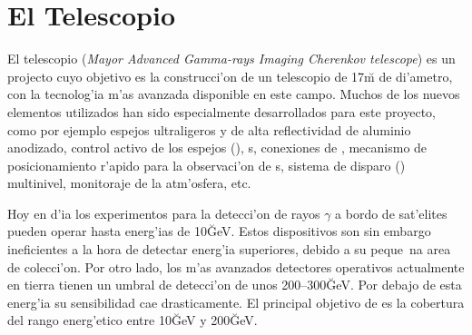 
\chapter{El Telescopio \MAGIC}
\label{chapter:magic}

El telescopio \Cerenkov {} (\emph{Mayor Advanced Gamma-rays
Imaging Cherenkov telescope}) es un projecto cuyo objetivo es la
construcci'on de un telescopio \Cerenkov de 17\u{m} de di'ametro, con
la tecnolog'ia m'as avanzada disponible en este campo. Muchos de los
nuevos elementos utilizados han sido especialmente desarrollados para
este proyecto, como por ejemplo espejos ultraligeros y de alta
reflectividad de aluminio anodizado, control activo de los espejos
(), s, conexiones de , mecanismo de posicionamiento r'apido para la observaci'on de
s, sistema de disparo () multinivel, monitoraje de
la atm'osfera, etc.

Hoy en d'ia los experimentos para la detecci'on de rayos $\gamma$ a
bordo de sat'elites pueden operar hasta energ'ias de 10\u{GeV}. Estos
dispositivos son sin embargo ineficientes a la hora de detectar
energ'ia superiores, debido a su peque~na area de colecci'on. Por otro
lado, los m'as avanzados detectores \Cerenkov operativos actualmente
en tierra tienen un umbral de detecci'on de unos 200--300\u{GeV}. Por
debajo de esta energ'ia su sensibilidad cae drasticamente. El
principal objetivo de \MAGIC es la cobertura del rango energ'etico
entre 10\u{GeV} y 200\u{GeV}.
%
\energygapfig

